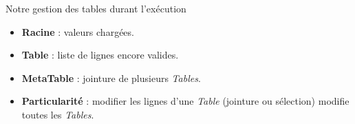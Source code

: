 \documentclass[aspectratio=43,12pt]{beamer}
\begin{document}
\begin{frame}{Notre gestion des tables durant l'exécution}

    \begin{center}
    \end{center}

    \begin{itemize}
        \item \textbf{Racine} : valeurs chargées.
        \item \textbf{Table} : liste de lignes encore valides.
        \item \textbf{MetaTable} : jointure de plusieurs \textit{Tables}.
        \item \textbf{Particularité} : modifier les lignes d'une \textit{Table} (jointure ou sélection) modifie toutes les \textit{Tables}.
    \end{itemize}

\end{frame}
\end{document}

